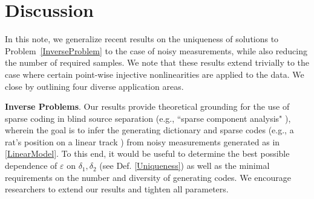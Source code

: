\documentclass[journal, twocolumn]{IEEEtran}
\begin{document}
\section{Discussion}\label{Discussion}

In this note, we generalize recent results \cite{Hillar15} on the uniqueness of solutions to Problem~\ref{InverseProblem} to the case of noisy measurements, while also reducing the number of required samples.
We note that these results extend trivially to the case where certain point-wise injective nonlinearities are applied to the data. We close by outlining  four diverse application areas.


\textbf{Inverse Problems}.  
Our results provide theoretical grounding for the use of sparse coding in blind source separation (e.g., ``sparse component analysis" \cite{li2004analysis}), wherein the goal is to infer the generating dictionary and sparse codes (e.g., a rat's position on a linear track \cite{Agarwal14}) from noisy measurements generated as in \eqref{LinearModel}. To this end, it would be useful to determine the best possible dependence of $\varepsilon$ on $\delta_1, \delta_2$ (see Def. \ref{Uniqueness}) as well as the minimal requirements on the number and diversity of generating codes. We encourage researchers to extend our results and tighten all parameters.
\end{document}
